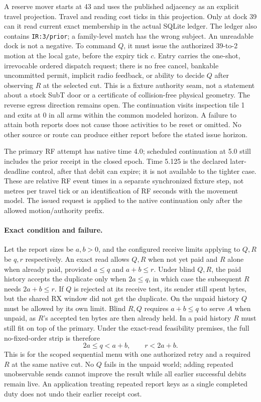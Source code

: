 \documentclass{article}
\begin{document}
A reserve mover starts at 43 and uses the published adjacency
as an explicit travel projection. Travel and reading cost ticks
in this projection. Only at dock 39 can it read current exact
membership in the actual SQLite ledger. The ledger also contains
\texttt{IR:3/prior}; a family-level match has the wrong subject.
An unreadable dock is not a negative. To command $Q$, it must
issue the authorized 39-to-2 motion at the local gate, before
the expiry tick $c$. Entry carries the one-shot, irrevocable
ordered dispatch request; there is no free cancel, bankable
uncommitted permit, implicit radio feedback, or ability to
decide $Q$ after observing $R$ at the selected cut. This is a
fixture authority seam, not a statement about a stock SubT door
or a certificate of collision-free physical geometry. The reverse
egress direction remains open. The continuation visits inspection
tile 1 and exits at 0 in all arms within the common modeled
horizon. A failure to attain both reports does not cause those
activities to be reset or omitted. No other source or route can
produce either report before the stated issue horizon.

The primary RF attempt has native time 4.0; scheduled continuation
at 5.0 still includes the prior receipt in the closed epoch.
Time 5.125 is the declared later-deadline control, after that
debit can expire; it is not available to the tighter case. These
are relative RF event times in a separate synchronized fixture
step, not metres per travel tick or an identification of RF seconds
with the movement model. The issued request is applied to the
native continuation only after the allowed motion/authority prefix.

\paragraph{Exact condition and failure.}
Let the report sizes be $a,b>0$, and the configured receive
limits applying to $Q,R$ be $q,r$ respectively. An exact read
allows $Q,R$ when not yet paid and $R$ alone when already paid,
provided $a\le q$ and $a+b\le r$. Under blind $Q,R$, the paid
history accepts the duplicate only when $2a\le q$, in which case
the subsequent $R$ needs $2a+b\le r$. If $Q$ is rejected at its
receive test, its sender still spent bytes, but the shared RX
window did not get the duplicate. On the unpaid history $Q$
must be allowed by its own limit. Blind $R,Q$ requires
$a+b\le q$ to serve $A$ when unpaid, as $R$'s accepted ten bytes
are then already held. In a paid history $R$ must still fit on
top of the primary. Under the exact-read feasibility premises,
the full no-fixed-order strip is therefore
\[
             2a\le q<a+b,\qquad r<2a+b.
\]
This is for the scoped sequential menu with one authorized
retry and a required $R$ at the same native cut. No $Q$ fails
in the unpaid world; adding repeated unobservable sends cannot
improve the result while all earlier successful debits
remain live. An application treating repeated report keys as a
single completed duty does not undo their earlier receipt cost.
\end{document}
